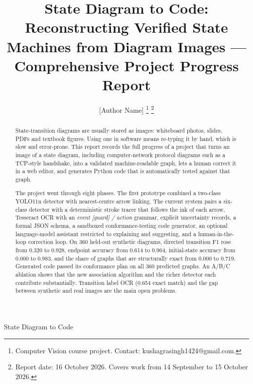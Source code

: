 \documentclass[journal,10pt]{IEEEtran}
\begin{document}
\title{State Diagram to Code: Reconstructing Verified State Machines from Diagram
Images --- Comprehensive Project Progress Report}

\author{[Author Name]%
\thanks{Computer Vision course project. Contact: kushagrasingh1424@gmail.com.}%
\thanks{Report date: 16 October 2026. Covers work from 14 September to 15 October 2026.}}

%
{State Diagram to Code}

\maketitle

\begin{abstract}
State-transition diagrams are usually stored as images: whiteboard photos, slides, PDFs
and textbook figures. Using one in software means re-typing it by hand, which is slow and
error-prone. This report records the full progress of a project that turns an image of a
state diagram, including computer-network protocol diagrams such as a TCP-style
handshake, into a validated machine-readable graph, lets a human correct it in a web
editor, and generates Python code that is automatically tested against that graph.

The project went through eight phases. The first prototype combined a two-class YOLO11n
detector with nearest-centre arrow linking. The current system pairs a six-class
detector with a deterministic stroke tracer that follows the ink of each arrow, Tesseract
OCR with an \emph{event [guard] / action} grammar, explicit uncertainty records, a formal
JSON schema, a sandboxed conformance-testing code generator, an optional language-model
assistant restricted to explaining and suggesting, and a human-in-the-loop correction
loop. On 360 held-out synthetic diagrams, directed transition F1 rose from 0.320 to 0.928,
endpoint accuracy from 0.614 to 0.964, initial-state accuracy from 0.000 to 0.983, and the
share of graphs that are structurally exact from 0.000 to 0.719. Generated code passed its
conformance plan on all 360 predicted graphs. An A/B/C ablation shows that the new
association algorithm and the richer detector each contribute substantially. Transition
label OCR (0.654 exact match) and the gap between synthetic and real images are the main
open problems.
\end{abstract}
\end{document}
